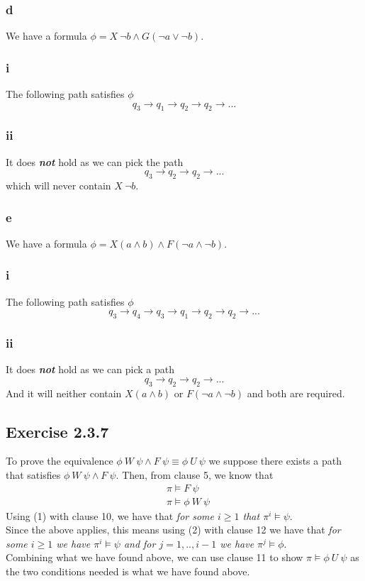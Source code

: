 \documentclass[12pt]{article}
\begin{document}
\subsubsection*{d}
We have a formula $\phi=X\:\neg b \land G(\neg a\lor\neg b)$.
\subsubsection*{i}
The following path satisfies $\phi$
$$q_3\to q_1\to q_2\to q_2\to ...$$
\subsubsection*{ii}
It does \textit{\textbf{not}} hold as we can pick the path
$$q_3\to q_2\to q_2\to ...$$
which will never contain $X\:\neg b$.

\subsubsection*{e}
We have a formula $\phi=X(a\land b)\land F(\neg a\land\neg b)$.
\subsubsection*{i}
The following path satisfies $\phi$
$$q_3\to q_4\to q_3\to q_1\to q_2\to q_2\to ...$$
\subsubsection*{ii}
It does \textit{\textbf{not}} hold as we can pick a path
$$q_3\to q_2\to q_2\to ...$$
And it will neither contain $X(a\land b)$ or $F(\neg a\land\neg b)$ and both are required.
\newpage
\subsection*{Exercise 2.3.7}
To prove the equivalence $\phi\:W\:\psi\land F\:\psi\equiv\phi\:U\:\psi$ we suppose there exists a path that satisfies $\phi\:W\:\psi\land F\:\psi$. Then, from clause 5, we know that 
\begin{align}
&\pi\models F\:\psi \\
&\pi\models\phi\:W\:\psi
\end{align}
Using (1) with clause 10, we have that \textit{for some $i\geq 1$ that $\pi^i\models\psi$}.\\
Since the above applies, this means using (2) with clause 12 we have that \textit{for some $i\geq 1$ we have $\pi^i\models\psi$ and for $j=1,..,i-1$ we have $\pi^j\models\phi$}.\\
Combining what we have found above, we can use clause 11 to show $\pi\models\phi\:U\:\psi$ as the two conditions needed is what we have found above.
\newpage
\end{document}
